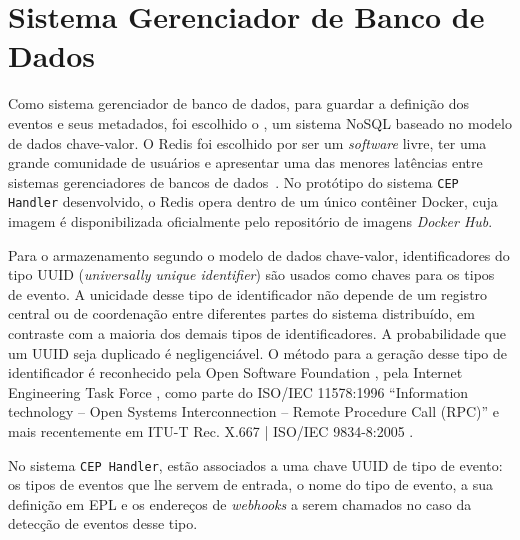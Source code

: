 \section{Sistema Gerenciador de Banco de Dados}
\label{sec:redis}

Como sistema gerenciador de banco de dados, para guardar a definição dos eventos e seus metadados, foi escolhido o \cite{Redis}, um sistema NoSQL baseado no modelo de dados chave-valor.
O Redis foi escolhido por ser um \textit{software} livre, ter uma grande comunidade de usuários e apresentar uma das menores latências entre sistemas gerenciadores de bancos de dados~\citep{10.14778/2367502.2367512}.
No protótipo do sistema \texttt{CEP Handler} desenvolvido, o Redis opera dentro de um único contêiner Docker, cuja imagem é disponibilizada oficialmente pelo repositório de imagens \textit{Docker Hub}.
 

Para o armazenamento segundo o modelo de dados chave-valor,  identificadores do tipo UUID (\textit{universally unique identifier}) são usados como chaves para os tipos de evento. A unicidade desse tipo de identificador não depende de um registro central ou de coordenação entre diferentes partes do sistema distribuído, em contraste com a maioria dos demais tipos de identificadores. A probabilidade que um UUID seja duplicado é negligenciável. O método para a geração desse tipo de identificador é reconhecido pela Open Software Foundation
\citep{osf}, 
pela  Internet Engineering Task Force %
\citep{ietf}, como parte do  ISO/IEC 11578:1996 ``Information technology – Open Systems Interconnection – Remote Procedure Call (RPC)'' e mais recentemente em  ITU-T Rec. X.667 | ISO/IEC 9834-8:2005
\citep{ISOUUID}.%

No sistema \texttt{CEP Handler}, estão associados a  uma chave UUID de tipo de evento: os tipos de eventos que lhe servem de entrada, o nome do tipo de evento, a sua definição em EPL e os endereços de \textit{webhooks} a serem chamados no caso da detecção de eventos desse tipo.




